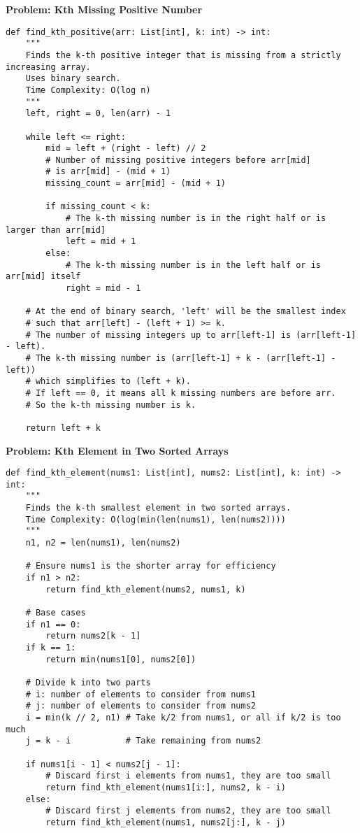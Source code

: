 \noindent\textbf{Problem: Kth Missing Positive Number}
\begin{verbatim}
def find_kth_positive(arr: List[int], k: int) -> int:
    """
    Finds the k-th positive integer that is missing from a strictly increasing array.
    Uses binary search.
    Time Complexity: O(log n)
    """
    left, right = 0, len(arr) - 1

    while left <= right:
        mid = left + (right - left) // 2
        # Number of missing positive integers before arr[mid]
        # is arr[mid] - (mid + 1)
        missing_count = arr[mid] - (mid + 1)

        if missing_count < k:
            # The k-th missing number is in the right half or is larger than arr[mid]
            left = mid + 1
        else:
            # The k-th missing number is in the left half or is arr[mid] itself
            right = mid - 1
    
    # At the end of binary search, 'left' will be the smallest index
    # such that arr[left] - (left + 1) >= k.
    # The number of missing integers up to arr[left-1] is (arr[left-1] - left).
    # The k-th missing number is (arr[left-1] + k - (arr[left-1] - left))
    # which simplifies to (left + k).
    # If left == 0, it means all k missing numbers are before arr.
    # So the k-th missing number is k.
    
    return left + k
\end{verbatim}

\noindent\textbf{Problem: Kth Element in Two Sorted Arrays}
\begin{verbatim}
def find_kth_element(nums1: List[int], nums2: List[int], k: int) -> int:
    """
    Finds the k-th smallest element in two sorted arrays.
    Time Complexity: O(log(min(len(nums1), len(nums2))))
    """
    n1, n2 = len(nums1), len(nums2)

    # Ensure nums1 is the shorter array for efficiency
    if n1 > n2:
        return find_kth_element(nums2, nums1, k)

    # Base cases
    if n1 == 0:
        return nums2[k - 1]
    if k == 1:
        return min(nums1[0], nums2[0])

    # Divide k into two parts
    # i: number of elements to consider from nums1
    # j: number of elements to consider from nums2
    i = min(k // 2, n1) # Take k/2 from nums1, or all if k/2 is too much
    j = k - i           # Take remaining from nums2

    if nums1[i - 1] < nums2[j - 1]:
        # Discard first i elements from nums1, they are too small
        return find_kth_element(nums1[i:], nums2, k - i)
    else:
        # Discard first j elements from nums2, they are too small
        return find_kth_element(nums1, nums2[j:], k - j)
\end{verbatim}

